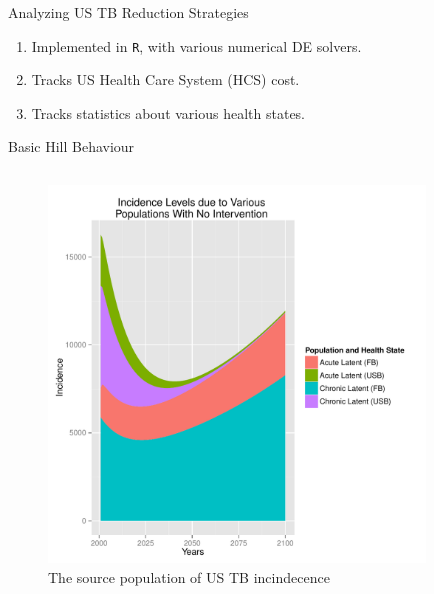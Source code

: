 \documentclass[final]{beamer}
\begin{document}
\begin{frame}
\begin{columns}
    \begin{column}{.3\textwidth}
      \begin{block}{Analyzing US TB Reduction Strategies}
        \begin{enumerate}
          \item Implemented in \texttt{R}, with various numerical DE solvers.
          \item Tracks US Health Care System (HCS) cost.
          \item Tracks statistics about various health states.
        \end{enumerate}
        \begin{block}{Basic Hill Behaviour}
          \vspace{-1.6em}
          \begin{column}{.45\textwidth}
            \begin{figure}[h]
              \begin{center}
                \includegraphics[height=10cm,width=\textwidth]{incPlotSourced}
              \end{center}
              \caption{The source population of US TB incindecence}
              \label{fig:incPlotSourced}
            \end{figure}
          \end{column}
          \begin{column}{.45\textwidth}
            \begin{figure}[h]
              \begin{center}

\end{center}
\end{figure}
\end{column}
\end{block}
\end{block}
\end{column}
\end{columns}
\end{frame}
\end{document}
